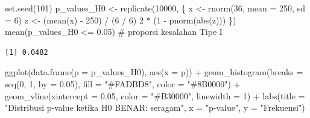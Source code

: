 \documentclass[
  indonesian,
  letterpaper,
]{book}
\newenvironment{Shaded}{\begin{snugshade}}{\end{snugshade}}
\newcommand{\AttributeTok}[1]{\textcolor[rgb]{0.40,0.45,0.13}{#1}}
\newcommand{\CommentTok}[1]{\textcolor[rgb]{0.37,0.37,0.37}{#1}}
\newcommand{\DecValTok}[1]{\textcolor[rgb]{0.68,0.00,0.00}{#1}}
\newcommand{\FloatTok}[1]{\textcolor[rgb]{0.68,0.00,0.00}{#1}}
\newcommand{\FunctionTok}[1]{\textcolor[rgb]{0.28,0.35,0.67}{#1}}
\newcommand{\NormalTok}[1]{\textcolor[rgb]{0.00,0.23,0.31}{#1}}
\newcommand{\OtherTok}[1]{\textcolor[rgb]{0.00,0.23,0.31}{#1}}
\newcommand{\SpecialCharTok}[1]{\textcolor[rgb]{0.37,0.37,0.37}{#1}}
\newcommand{\StringTok}[1]{\textcolor[rgb]{0.13,0.47,0.30}{#1}}
\begin{document}
\begin{Shaded}
\begin{Highlighting}[]
\FunctionTok{set.seed}\NormalTok{(}\DecValTok{101}\NormalTok{)}
\NormalTok{p\_values\_H0 }\OtherTok{\textless{}{-}} \FunctionTok{replicate}\NormalTok{(}\DecValTok{10000}\NormalTok{, \{}
\NormalTok{  x }\OtherTok{\textless{}{-}} \FunctionTok{rnorm}\NormalTok{(}\DecValTok{36}\NormalTok{, }\AttributeTok{mean =} \DecValTok{250}\NormalTok{, }\AttributeTok{sd =} \DecValTok{6}\NormalTok{)}
\NormalTok{  z }\OtherTok{\textless{}{-}}\NormalTok{ (}\FunctionTok{mean}\NormalTok{(x) }\SpecialCharTok{{-}} \DecValTok{250}\NormalTok{) }\SpecialCharTok{/}\NormalTok{ (}\DecValTok{6} \SpecialCharTok{/} \DecValTok{6}\NormalTok{)}
  \DecValTok{2} \SpecialCharTok{*}\NormalTok{ (}\DecValTok{1} \SpecialCharTok{{-}} \FunctionTok{pnorm}\NormalTok{(}\FunctionTok{abs}\NormalTok{(z)))}
\NormalTok{\})}
\FunctionTok{mean}\NormalTok{(p\_values\_H0 }\SpecialCharTok{\textless{}=} \FloatTok{0.05}\NormalTok{)   }\CommentTok{\# proporsi kesalahan Tipe I}
\end{Highlighting}
\end{Shaded}

\begin{verbatim}
[1] 0.0482
\end{verbatim}

\begin{Shaded}
\begin{Highlighting}[]
\FunctionTok{ggplot}\NormalTok{(}\FunctionTok{data.frame}\NormalTok{(}\AttributeTok{p =}\NormalTok{ p\_values\_H0), }\FunctionTok{aes}\NormalTok{(}\AttributeTok{x =}\NormalTok{ p)) }\SpecialCharTok{+}
  \FunctionTok{geom\_histogram}\NormalTok{(}\AttributeTok{breaks =} \FunctionTok{seq}\NormalTok{(}\DecValTok{0}\NormalTok{, }\DecValTok{1}\NormalTok{, }\AttributeTok{by =} \FloatTok{0.05}\NormalTok{), }\AttributeTok{fill =} \StringTok{"\#FADBD8"}\NormalTok{, }\AttributeTok{color =} \StringTok{"\#8B0000"}\NormalTok{) }\SpecialCharTok{+}
  \FunctionTok{geom\_vline}\NormalTok{(}\AttributeTok{xintercept =} \FloatTok{0.05}\NormalTok{, }\AttributeTok{color =} \StringTok{"\#B30000"}\NormalTok{, }\AttributeTok{linewidth =} \DecValTok{1}\NormalTok{) }\SpecialCharTok{+}
  \FunctionTok{labs}\NormalTok{(}\AttributeTok{title =} \StringTok{"Distribusi p{-}value ketika H0 BENAR: seragam"}\NormalTok{, }\AttributeTok{x =} \StringTok{"p{-}value"}\NormalTok{, }\AttributeTok{y =} \StringTok{"Frekuensi"}\NormalTok{)}
\end{Highlighting}
\end{Shaded}
\end{document}
